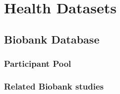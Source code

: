 \chapter{Health Datasets}

\section{Biobank Database} \label{App:Biobank}

\subsection{Participant Pool}


\subsection{Related Biobank studies} \label{App:Biobank studies}
